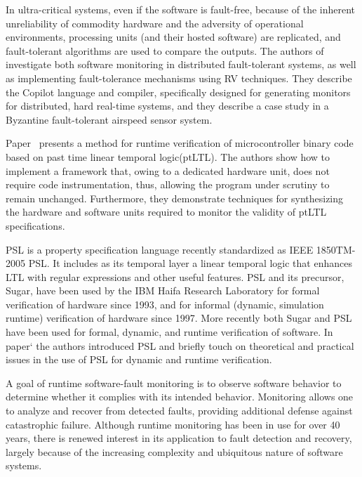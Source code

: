 In ultra-critical systems, even if the software is fault-free, because of the inherent unreliability of commodity hardware and the adversity of operational environments, processing units (and their hosted software) are replicated, and fault-tolerant algorithms are used to compare the outputs. The authors of~\citep{pike2012runtime} investigate both software monitoring in distributed fault-tolerant systems, as well as implementing fault-tolerance mechanisms using RV techniques. They describe the Copilot language and compiler, specifically designed for generating monitors for distributed, hard real-time systems, and they describe a case study in a Byzantine fault-tolerant airspeed sensor system.

Paper~\citep{reinbacher2011past} presents  a  method  for  runtime  verification  of microcontroller binary code based on past time linear temporal logic(ptLTL).  The authors  show  how  to  implement  a  framework  that,  owing  to  a	dedicated hardware unit, does not require code instrumentation, thus,		allowing the program under scrutiny to remain unchanged. Furthermore, they demonstrate techniques for synthesizing the hardware and software units required to monitor the validity of	ptLTL specifications.

PSL is a property specification language recently standardized as IEEE 1850TM-2005 PSL. It includes as its temporal layer a linear temporal logic that enhances LTL with regular expressions and other useful features. PSL and its precursor, Sugar, have been used by the IBM Haifa Research Laboratory for formal verification of hardware since 1993, and for informal (dynamic, simulation runtime) verification of hardware since 1997. More recently both Sugar and PSL have been used for formal, dynamic, and runtime verification of software. In paper`\citep{eisner2007psl} the authors introduced PSL and briefly touch on theoretical and practical issues in the use of PSL for dynamic and runtime verification.

A goal of runtime software-fault monitoring is to observe software behavior to determine whether it complies with its intended behavior. Monitoring allows one to analyze and recover from detected faults, providing additional defense against catastrophic failure. Although runtime monitoring has been in use for over 40 years, there is renewed interest in its application to fault detection and recovery, largely because of the increasing complexity and ubiquitous nature of software systems.\citep{delgado2004taxonomy}
